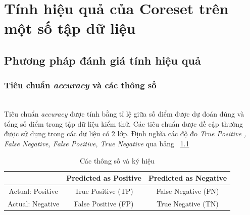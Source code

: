 \documentclass[a4paper, 12pt, oneside]{report}
\begin{document}
\chapter{Tính hiệu quả của Coreset trên một số tập dữ liệu}
\section{Phương pháp đánh giá tính hiệu quả}
\subsection{ Tiêu chuẩn \textit{accuracy} và các thông số} \\
Tiêu chuẩn \textit{accuracy} được tính bằng tỉ lệ giữa số điểm được dự đoán đúng và tổng số điểm trong tập dữ liệu kiểm thử. Các tiêu chuẩn được đề cập thường được sử dụng trong các dữ liệu có 2 lớp. Định nghĩa các độ đo \textit{True Positive , False Negative, False Positive, True Negative} qua bảng ~\ref{bang_TF}\\
\begin{table}
\begin{tabular}{|c|c|c|}
\hline 
& Predicted as Positive & Predicted as Negative\\ 
\hline 
  Actual: Positive& True Positive (TP)  & False Negative (FN)\\ 
\hline 
 Actual: Negative & False Positive (FP) & True Negative (TN)\\ 
\hline 
\end{tabular}
\\
\caption{Các thông số và ký hiệu}
\label{bang_TF}
\end{table}
\\
\end{document}
